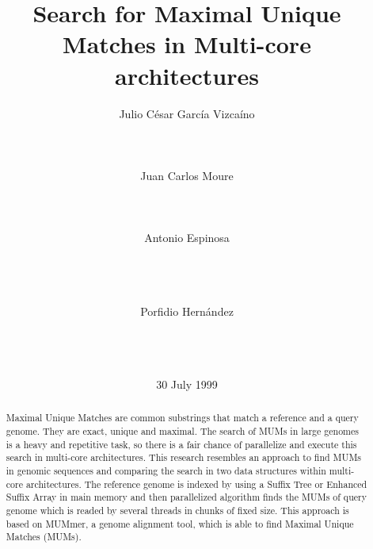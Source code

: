 \documentclass{acm_proc_article-sp}
\begin{document}
\title{Search for Maximal Unique Matches in Multi-core architectures}

%
\author{
\alignauthor Julio C\'esar Garc\'ia Vizca\'ino\\
       \\
       \\
       \\
\alignauthor Juan Carlos Moure\\
       \\
       \\
       \\
\alignauthor Antonio Espinosa\\
       \\
       \\
       \\
\and  %
\alignauthor Porfidio Hern\'andez\\
       \\
       \\
       \\
}
\date{30 July 1999}

\maketitle
\begin{abstract}
  Maximal Unique Matches are common substrings that match a reference and a query genome. They are exact, unique and maximal. The search of MUMs in large genomes is a heavy and repetitive task, so there is a fair chance of parallelize and execute this search in multi-core architectures. This research resembles an approach to find MUMs in genomic sequences and comparing the search in two data structures within multi-core architectures. The reference genome is indexed by using a Suffix Tree or Enhanced Suffix Array in main memory and then parallelized algorithm finds the MUMs of query genome which is readed by several threads in chunks of fixed size. This approach is based on MUMmer, a genome alignment tool, which is able to find Maximal Unique Matches (MUMs). 
\end{abstract}
\end{document}
